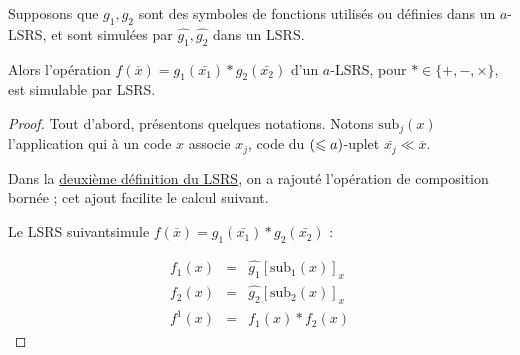 	
	\begin{lemma}
		\label{lem:operation_simulable}
		Supposons que $g_1, g_2$ sont des symboles de fonctions utilisés ou définies dans un $a$-LSRS, et sont simulées par $\hat{g_1},\hat{g_2}$ dans un LSRS.
		
		Alors l'opération $f\left(\overline{x}\right) = g_1\left(\bar{x_1}\right) * g_2\left(\bar{x_2}\right)$ d'un $a$-LSRS, pour $* \in \{+, -, \times \}$, est simulable par LSRS.
	\end{lemma}
	
	\begin{proof}
		Tout d'abord, présentons quelques notations. Notons $\text{sub}_j(x)$ l'application qui à un code $x$ associe $x_j$, code du $\left( \leqslant a \right)$-uplet $\bar{x_j} \ll \overline{x}$. 
		
		Dans la \hyperref[def:LSRS_2]{deuxième définition du LSRS}, on a rajouté l'opération de composition bornée ; cet ajout facilite le calcul suivant. 
		
		Le LSRS suivant\footnotemark  simule $f\left(\overline{x}\right) = g_1\left(\bar{x_1}\right) * g_2\left(\bar{x_2}\right)$ :
			
		
		\begin{eqnarray}
			f_1(x) & = & \hat{g_1}\left[ \text{sub}_1(x) \right]_x \\
			f_2(x) & = & \hat{g_2}\left[ \text{sub}_2(x) \right]_x \\
			f^1(x) & = & f_1(x) * f_2(x) 
		\end{eqnarray}
	\end{proof}
	
